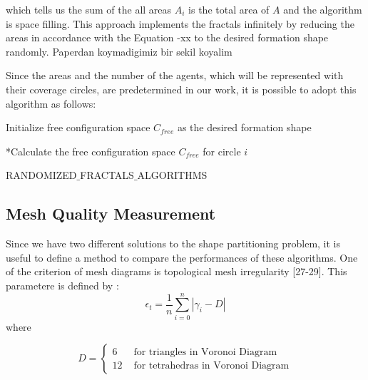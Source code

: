 \documentclass[twoside]{article}
\begin{document}
		which tells us the sum of the all areas $A_i$ is the total area of $A$ and the algorithm is space filling. This approach implements the fractals infinitely by reducing the areas in accordance with the Equation -xx to the desired formation shape randomly. 
		Paperdan koymadigimiz bir sekil koyalim
		
		Since the areas and the number of the agents, which will be represented with their coverage circles, are predetermined in our work, it is possible to adopt this algorithm as follows:
		
					\begin{algorithm}[H]
						
						Initialize free configuration space $C_{free}$ as the desired formation shape
						
						{		
							*Calculate the free configuration space $C_{free}$ for circle $i$\;
												
						}												
						
						\caption{RANDOMIZED$\_$FRACTALS$\_$ALGORITHMS}
					\end{algorithm}
	
	
	\subsection{Mesh Quality Measurement}
	Since we have two different solutions to the shape partitioning problem, it is useful to define a method to compare the performances of these algorithms. One of the criterion of mesh diagrams is topological mesh irregularity [27-29]. This parametere is defined by : 
	\begin{equation}
\epsilon _t = \frac{1}{n} \sum_{i = 0}^{n} |\gamma _i - D|
	\end{equation}
	where 
	
	
			\begin{equation}
			D = \left\{ \begin{array}{rl}
			6                               &\mbox{ for triangles in Voronoi Diagram} \\
			12                             &\mbox{ for tetrahedras in Voronoi Diagram}
			\end{array} \right.
			\end{equation}
	
\end{document}
